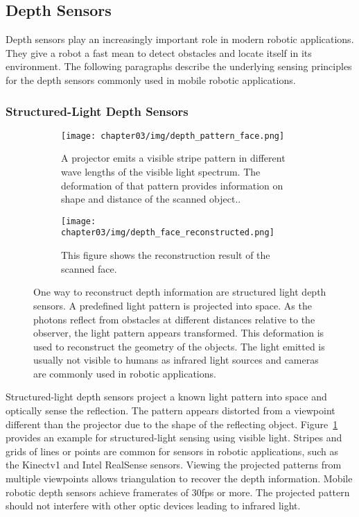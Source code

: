 \subsection{Depth Sensors}

Depth sensors play an increasingly important role in modern robotic applications.
They give a robot a fast mean to detect obstacles and locate itself in its environment.
The following paragraphs describe the underlying sensing principles\cite{blais_2003} for the depth sensors commonly used in mobile robotic applications.

\subsubsection{Structured-Light Depth Sensors}

\begin{figure}[H]
    \centering
    \begin{subfigure}[t]{0.45\textwidth}
        \texttt{[image: chapter03/img/depth\_pattern\_face.png]}
        \caption{A projector emits a visible stripe pattern in different wave lengths of the visible light spectrum. The deformation of that pattern provides information on shape and distance of the scanned object.\cite{sl_depthsensor_calibration}.}
    \end{subfigure}
    \begin{subfigure}[t]{0.45\textwidth}
        \texttt{[image: chapter03/img/depth\_face\_reconstructed.png]}
        \caption{This figure shows the reconstruction result of the scanned face\cite{sl_depthsensor_calibration}.}
    \end{subfigure}
    \caption[Demonstration of visible light patterns used for structured-light depth sensors]{One way to reconstruct depth information are structured light depth sensors. A predefined light pattern is projected into space. As the photons reflect from obstacles at different distances relative to the observer, the light pattern appears transformed. This deformation is used to reconstruct the geometry of the objects. The light emitted is usually not visible to humans as infrared light sources and cameras are commonly used in robotic applications.\label{fig:sl_face}}
\end{figure}
Structured-light depth sensors project a known light pattern into space and optically sense the reflection.
The pattern appears distorted from a viewpoint different than the projector due to the shape of the reflecting object.
Figure~\ref{fig:sl_face} provides an example for structured-light sensing using visible light.
Stripes and grids of lines or points are common for sensors in robotic applications, such as the Kinectv1 and Intel RealSense\cite{intel_realsense} sensors.
Viewing the projected patterns from multiple viewpoints allows triangulation to recover the depth information.
Mobile robotic depth sensors achieve framerates of 30fps or more.
The projected pattern should not interfere with other optic devices leading to infrared light.

